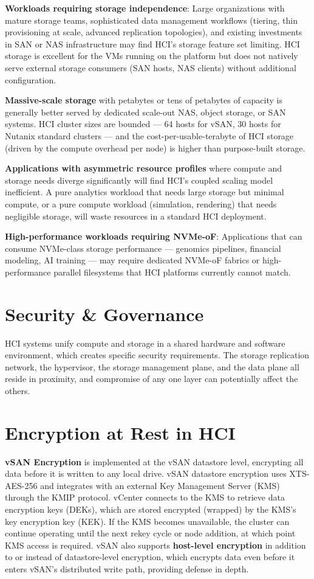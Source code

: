 \textbf{Workloads requiring storage independence}: Large organizations with mature storage teams, sophisticated data management workflows (tiering, thin provisioning at scale, advanced replication topologies), and existing investments in SAN or NAS infrastructure may find HCI's storage feature set limiting. HCI storage is excellent for the VMs running on the platform but does not natively serve external storage consumers (SAN hosts, NAS clients) without additional configuration.

\textbf{Massive-scale storage} with petabytes or tens of petabytes of capacity is generally better served by dedicated scale-out NAS, object storage, or SAN systems. HCI cluster sizes are bounded --- 64 hosts for vSAN, 30 hosts for Nutanix standard clusters --- and the cost-per-usable-terabyte of HCI storage (driven by the compute overhead per node) is higher than purpose-built storage.

\textbf{Applications with asymmetric resource profiles} where compute and storage needs diverge significantly will find HCI's coupled scaling model inefficient. A pure analytics workload that needs large storage but minimal compute, or a pure compute workload (simulation, rendering) that needs negligible storage, will waste resources in a standard HCI deployment.

\textbf{High-performance workloads requiring NVMe-oF}: Applications that can consume NVMe-class storage performance --- genomics pipelines, financial modeling, AI training --- may require dedicated NVMe-oF fabrics or high-performance parallel filesystems that HCI platforms currently cannot match.

\section{Security \& Governance}
HCI systems unify compute and storage in a shared hardware and software environment, which creates specific security requirements. The storage replication network, the hypervisor, the storage management plane, and the data plane all reside in proximity, and compromise of any one layer can potentially affect the others.

\section{Encryption at Rest in HCI}
\textbf{vSAN Encryption} is implemented at the vSAN datastore level, encrypting all data before it is written to any local drive. vSAN datastore encryption uses XTS-AES-256 and integrates with an external Key Management Server (KMS) through the KMIP protocol. vCenter connects to the KMS to retrieve data encryption keys (DEKs), which are stored encrypted (wrapped) by the KMS's key encryption key (KEK). If the KMS becomes unavailable, the cluster can continue operating until the next rekey cycle or node addition, at which point KMS access is required. vSAN also supports \textbf{host-level encryption} in addition to or instead of datastore-level encryption, which encrypts data even before it enters vSAN's distributed write path, providing defense in depth.

